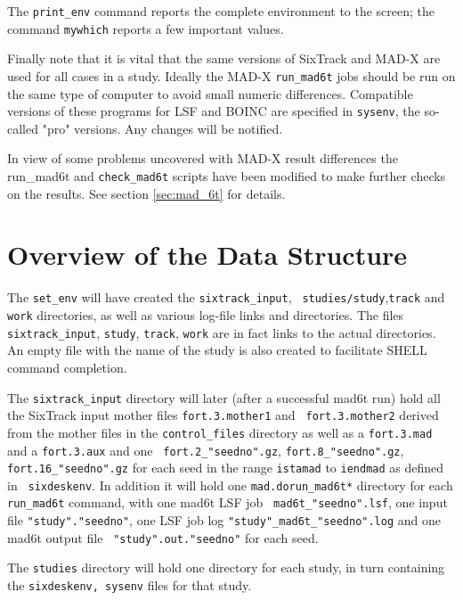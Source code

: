 \documentclass{cernatsnote}
\begin{document}
The \texttt{print\_env} command reports the complete environment to the screen;
the command \texttt{mywhich} reports a few important values.

Finally note that it is vital that the same versions of SixTrack and MAD-X are
used for all cases in a study. Ideally the MAD-X \texttt{run\_mad6t} jobs should
be run on the same type of computer to avoid small numeric differences.
Compatible versions of these programs for LSF and BOINC are specified
in \texttt{sysenv}, the so-called "pro" versions. Any changes will be notified.

In view of some problems uncovered with MAD-X result differences the run\_mad6t
and {\tt check\_mad6t} scripts have been modified to make further checks on
the results. See section \ref{sec:mad_6t} for details.

\section{Overview of the Data Structure}

The \texttt{set\_env} will have created the \texttt{sixtrack\_input}, {\tt
studies/study},\texttt{track} and \texttt{work} directories, as well as various
log-file links and directories.  The files \texttt{sixtrack\_input}, \texttt{study},
\texttt{track}, \texttt{work} are in fact links to the actual directories. An empty
file with the name of the study is also created to facilitate SHELL command
completion.

The \texttt{sixtrack\_input} directory will later (after a successful mad6t run)
hold all the SixTrack input mother files \texttt{fort.3.mother1} and {\tt
fort.3.mother2} derived from the mother files in the \texttt{control\_files}
directory as well as a \texttt{fort.3.mad} and a \texttt{fort.3.aux} and one {\tt
fort.2\_"seedno".gz}, \texttt{fort.8\_"seedno".gz}, \texttt{fort.16\_"seedno".gz} for
each seed in the range \texttt{istamad} to \texttt{iendmad} as defined in {\tt
sixdeskenv}. In addition it will hold one \texttt{mad.dorun\_mad6t*} directory for
each \texttt{run\_mad6t} command, with one mad6t LSF job {\tt
mad6t\_"seedno".lsf}, one input file \texttt{"study"."seedno"}, one LSF job log
\texttt{"study"\_mad6t\_"seedno".log} and one mad6t output file {\tt
"study".out."seedno"} for each seed.

The \texttt{studies} directory will hold one directory for each study, in turn
containing the \texttt{sixdeskenv, sysenv} files for that study.
\end{document}
